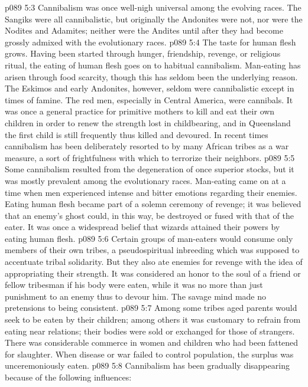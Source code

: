 \vs p089 5:3 Cannibalism was once well\hyp{}nigh universal among the evolving races. The Sangiks were all cannibalistic, but originally the Andonites were not, nor were the Nodites and Adamites; neither were the Andites until after they had become grossly admixed with the evolutionary races.
\vs p089 5:4 The taste for human flesh grows. Having been started through hunger, friendship, revenge, or religious ritual, the eating of human flesh goes on to habitual cannibalism. Man\hyp{}eating has arisen through food scarcity, though this has seldom been the underlying reason. The Eskimos and early Andonites, however, seldom were cannibalistic except in times of famine. The red men, especially in Central America, were cannibals. It was once a general practice for primitive mothers to kill and eat their own children in order to renew the strength lost in childbearing, and in Queensland the first child is still frequently thus killed and devoured. In recent times cannibalism has been deliberately resorted to by many African tribes as a war measure, a sort of frightfulness with which to terrorize their neighbors.
\vs p089 5:5 Some cannibalism resulted from the degeneration of once superior stocks, but it was mostly prevalent among the evolutionary races. Man\hyp{}eating came on at a time when men experienced intense and bitter emotions regarding their enemies. Eating human flesh became part of a solemn ceremony of revenge; it was believed that an enemy’s ghost could, in this way, be destroyed or fused with that of the eater. It was once a widespread belief that wizards attained their powers by eating human flesh.
\vs p089 5:6 Certain groups of man\hyp{}eaters would consume only members of their own tribes, a pseudospiritual inbreeding which was supposed to accentuate tribal solidarity. But they also ate enemies for revenge with the idea of appropriating their strength. It was considered an honor to the soul of a friend or fellow tribesman if his body were eaten, while it was no more than just punishment to an enemy thus to devour him. The savage mind made no pretensions to being consistent.
\vs p089 5:7 Among some tribes aged parents would seek to be eaten by their children; among others it was customary to refrain from eating near relations; their bodies were sold or exchanged for those of strangers. There was considerable commerce in women and children who had been fattened for slaughter. When disease or war failed to control population, the surplus was unceremoniously eaten.
\pc \vs p089 5:8 Cannibalism has been gradually disappearing because of the following influences:
